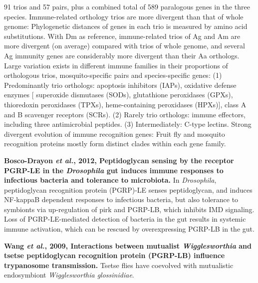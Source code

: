 \documentclass[11pt]{article}
\begin{document}
\begin{sloppypar}
91 trios and 57 pairs, plus a combined total of 589 paralogous genes in the three species. \newline
Immune-related orthology trios are more divergent than that of whole genome: \newline
Phylogenetic distances of genes in each trio is measured by amino acid substitutions. 
With Dm as reference, immune-related trios of Ag and Am are more divergent (on average) compared with trios of whole genome, and several Ag immunity genes are considerably more divergent than their Aa orthologs.\newline
Large variation exists in different immune families in their proportions of orthologous trios,
mosquito-specific pairs and species-specific genes: \newline
(1) Predominantly trio orthologs: 
apoptosis inhibitors (IAPs), 
oxidative defense enzymes [
    superoxide dismutases (SODs), 
    glutathione peroxidases (GPXs), 
    thioredoxin peroxidases (TPXs), 
    heme-containing peroxidases (HPXs)],
class A and B scavenger receptors (SCRs). \newline
(2) Rarely trio orthologs: 
immune effectors, including three antimicrobial peptides.\newline
(3) Intermediately: 
C-type lectins.\newline
Strong divergent evolution of immune recognition genes: \newline
Fruit fly and mosquito recognition proteins mostly form distinct clades within each gene family.
\par
\textbf{Bosco-Drayon \textit{et al.}, 2012, Peptidoglycan sensing by the receptor PGRP-LE in the \textit{Drosophila} gut induces immune responses to infectious bacteria and tolerance to microbiota.} \newline
In \textit{Drosophila}, peptidoglycan recognition protein (PGRP)-LE senses peptidoglycan, and induces NF-kappaB dependent responses to infectious bacteria, but also tolerance to symbionts via up-regulation of pirk and PGRP-LB, which inhibits IMD signaling. 
Loss of PGRP-LE-mediated detection of bacteria in the gut results in systemic immune activation, which can be rescued by overexpressing PGRP-LB in the gut.
\par
\textbf{Wang \textit{et al.}, 2009, Interactions between mutualist \textit{Wigglesworthia} and tsetse peptidoglycan recognition protein (PGRP-LB) influence trypanosome transmission.} \newline
Tsetse flies have coevolved with mutualistic endosymbiont \textit{Wigglesworthia glossinidiae}. 

\end{sloppypar}
\end{document}
